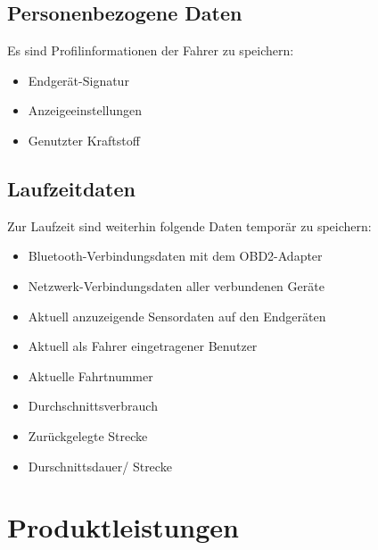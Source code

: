 \documentclass[pflichtenheft.tex]{subfiles}
\begin{document}
\section{\mkd Personenbezogene Daten}
Es sind Profilinformationen der Fahrer zu speichern:
\begin{itemize}
\item Endgerät-Signatur
\item Anzeigeeinstellungen
\item Genutzter Kraftstoff

\end{itemize}

\section{\mkd Laufzeitdaten}
Zur Laufzeit sind weiterhin folgende Daten temporär zu speichern:
\begin{itemize}
\item Bluetooth-Verbindungsdaten mit dem OBD2-Adapter
\item Netzwerk-Verbindungsdaten aller verbundenen Geräte
\item Aktuell anzuzeigende Sensordaten auf den Endgeräten
\item Aktuell als Fahrer eingetragener Benutzer
\item Aktuelle Fahrtnummer
\item Durchschnittsverbrauch
\item Zurückgelegte Strecke
\item Durschnittsdauer/ Strecke

\end{itemize}

\chapter{Produktleistungen}

\renewcommand{\theenumi}{/PL\ifnum \value{enumi}<10 0\fi\arabic{enumi}0/}
\renewcommand{\labelenumi}{\theenumi}
\renewcommand{\theenumii}{\arabic{enumii}}
\renewcommand{\labelenumii}{PL\ifnum \value{enumi}<10 0\fi\arabic{enumi}\arabic{enumii}/}
\end{document}
